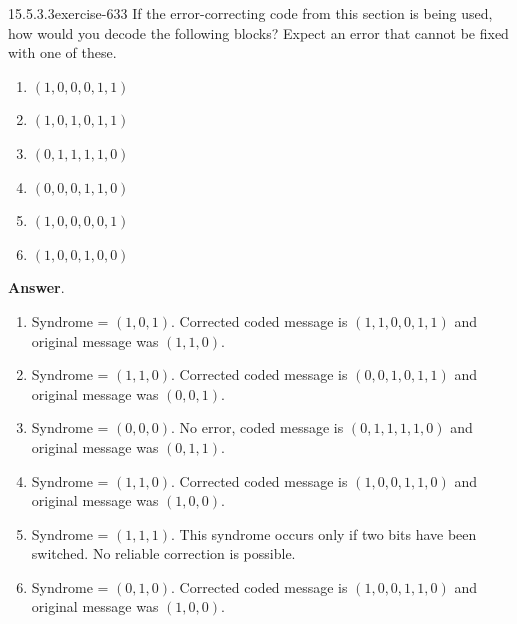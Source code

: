 \documentclass[twoside,10pt,]{book}
\numberwithin{equation}{section}
\begin{document}
\begin{divisionsolution}{15.5.3.3}{}{exercise-633}%
\hypertarget{p-5662}{}%
If the error-correcting code from this section is being used, how would you decode the following blocks? Expect an error that cannot be fixed with one of these.\leavevmode%
\begin{enumerate}[label=(\alph*)]
\item\hypertarget{li-2489}{}\hypertarget{p-5663}{}%
\((1,0,0,0,1,1)\)%
\item\hypertarget{li-2490}{}\hypertarget{p-5664}{}%
\((1,0,1,0,1,1)\)%
\item\hypertarget{li-2491}{}\hypertarget{p-5665}{}%
\((0,1,1,1,1,0)\)%
\item\hypertarget{li-2492}{}\hypertarget{p-5666}{}%
\((0,0,0,1,1,0)\)%
\item\hypertarget{li-2493}{}\hypertarget{p-5667}{}%
\((1,0,0,0,0,1)\)%
\item\hypertarget{li-2494}{}\hypertarget{p-5668}{}%
\((1,0,0,1,0,0)\)%
\end{enumerate}
%
\par\smallskip%
\noindent\textbf{Answer}.\quad%
\hypertarget{p-5669}{}%
\leavevmode%
\begin{enumerate}[label=(\alph*)]
\item\hypertarget{li-2495}{}\hypertarget{p-5670}{}%
Syndrome = \((1,0,1)\). Corrected coded message is \((1,1,0,0,1,1)\) and original message was \((1, 1, 0)\).%
\item\hypertarget{li-2496}{}\hypertarget{p-5671}{}%
Syndrome = \((1,1,0)\). Corrected coded message is \((0,0,1,0,1,1)\) and original message was \((0, 0, 1)\).%
\item\hypertarget{li-2497}{}\hypertarget{p-5672}{}%
Syndrome = \((0,0,0)\).  No error, coded message is \((0,1,1,1,1,0)\) and original message was \((0, 1, 1)\).%
\item\hypertarget{li-2498}{}\hypertarget{p-5673}{}%
Syndrome = \((1, 1,0)\). Corrected coded message is \((1,0,0,1,1,0)\) and original message was \((1, 0, 0)\).%
\item\hypertarget{li-2499}{}\hypertarget{p-5674}{}%
Syndrome = \((1,1,1)\). This syndrome occurs only if two bits have been switched. No reliable correction is possible.%
\item\hypertarget{li-2500}{}\hypertarget{p-5675}{}%
Syndrome = \((0,1,0)\). Corrected coded message is \((1,0,0,1,1,0)\) and original message was \((1, 0, 0)\).%
\end{enumerate}
%
\end{divisionsolution}%
\end{document}
